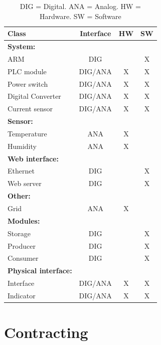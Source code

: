\begin{table}[H]
	\begin{tabular}{| l | c | c | c |}
	\hline
		Class						& Interface	& HW	& SW	\\ \hline
		\textbf{System:}					&			&		&		\\ \hline
		ARM							& DIG		&		& X 		\\ \hline
		PLC module					& DIG/ANA	& X		& X 		\\ \hline
		Power switch					& DIG/ANA	& X		& X 		\\ \hline
		Digital Converter				& DIG/ANA	& X		& X 		\\ \hline
		Current sensor					& DIG/ANA	& X		& X 		\\ \hline
		\textbf{Sensor:}					&			&		&		\\ \hline
		Temperature					& ANA		& X		& 	 	\\ \hline
		Humidity						& ANA		& X		& 		\\ \hline
		\textbf{Web interface:}			&			&		&		\\ \hline
		Ethernet						& DIG		& 		& X	 	\\ \hline
		Web server					& DIG		& 		& X		\\ \hline
		\textbf{Other:}					&			&		&		\\ \hline
		Grid							& ANA		& X		& 	 	\\ \hline
		\textbf{Modules:}				&			&		&		\\ \hline
		Storage						& DIG		& 		& X	 	\\ \hline
		Producer						& DIG		& 		& X		\\ \hline
		Consumer					& DIG		& 		& X		\\ \hline
		\textbf{Physical interface:}			&			&		&		\\ \hline
		Interface						& DIG/ANA	& X		& X	 	\\ \hline
		Indicator						& DIG/ANA	& X		& X		\\ \hline
	\end{tabular}
	\caption{DIG = Digital. ANA = Analog. HW = Hardware. SW = Software}
\end{table}

\section{Contracting}

